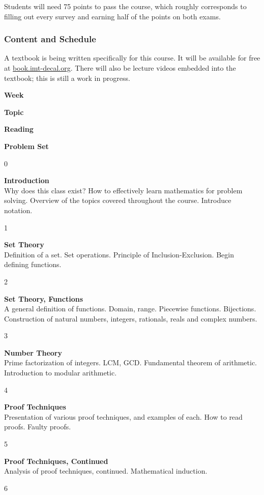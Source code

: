 \documentclass[]{article}
\begin{document}
Students will need 75 points to pass the course, which roughly
corresponds to filling out every survey and earning half of the points
on both exams.

\hypertarget{schedule}{%
\subsubsection{Content and Schedule}\label{schedule}}

A textbook is being written specifically for this course. It will be
available for free at
\href{http://book.imt-decal.org}{book.imt-decal.org}. There will also be
lecture videos embedded into the textbook; this is still a work in
progress.

\textbf{Week}

\textbf{Topic}

\textbf{Reading}

\textbf{Problem Set}

0

\textbf{Introduction}\\
Why does this class exist? How to effectively learn mathematics for
problem solving. Overview of the topics covered throughout the course.
Introduce notation.

1

\textbf{Set Theory}\\
Definition of a set. Set operations. Principle of Inclusion-Exclusion.
Begin defining functions.

2

\textbf{Set Theory, Functions}\\
A general definition of functions. Domain, range. Piecewise functions.
Bijections. Construction of natural numbers, integers, rationals, reals
and complex numbers.

3

\textbf{Number Theory}\\
Prime factorization of integers. LCM, GCD. Fundamental theorem of
arithmetic. Introduction to modular arithmetic.

4

\textbf{Proof Techniques}\\
Presentation of various proof techniques, and examples of each. How to
read proofs. Faulty proofs.

5

\textbf{Proof Techniques, Continued}\\
Analysis of proof techniques, continued. Mathematical induction.

6
\end{document}
